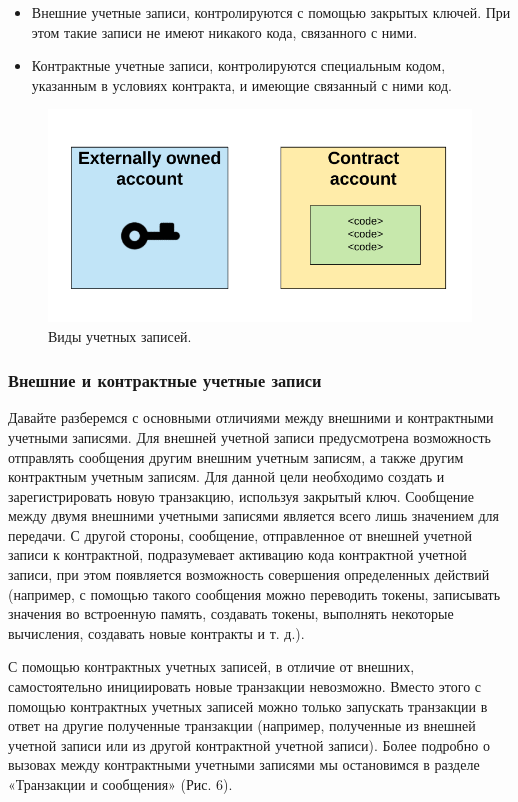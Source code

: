 \documentclass{article}
\begin{document}
\begin{itemize}
 \item Внешние учетные записи, контролируются с помощью закрытых ключей. При этом такие записи не имеют никакого кода, связанного с ними.
 \item Контрактные учетные записи, контролируются специальным кодом, указанным в условиях контракта, и имеющие связанный с ними код.
\end{itemize}


\begin{figure}
    \centering
    \includegraphics[scale=0.4]{scheme_5}
    \caption{Виды учетных записей.}
    \label{fig:scheme_5}
\end{figure}

\subsubsection{Внешние и контрактные учетные записи}

Давайте разберемся с основными отличиями между внешними и контрактными учетными записями. Для внешней учетной записи предусмотрена возможность отправлять сообщения другим внешним учетным записям, а также другим контрактным учетным записям. Для данной цели необходимо создать и зарегистрировать новую транзакцию, используя закрытый ключ. Сообщение между двумя внешними учетными записями является всего лишь значением для передачи. С другой стороны, сообщение, отправленное от внешней учетной записи к контрактной, подразумевает активацию кода контрактной учетной записи, при этом появляется возможность совершения определенных действий (например, с помощью такого сообщения можно переводить токены, записывать значения во встроенную память, создавать токены, выполнять некоторые вычисления, создавать новые контракты и т. д.). 

С помощью контрактных учетных записей, в отличие от внешних, самостоятельно инициировать новые транзакции невозможно. Вместо этого с помощью контрактных учетных записей можно только запускать транзакции в ответ на другие полученные транзакции (например, полученные из внешней учетной записи или из другой контрактной учетной записи). Более подробно о вызовах между контрактными учетными записями мы остановимся в разделе «Транзакции и сообщения» (Рис. 6).
\end{document}
